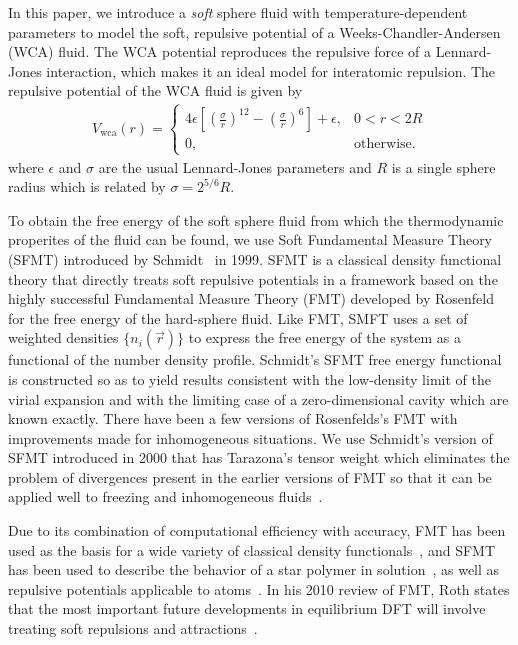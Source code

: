 \documentclass[letterpaper,twocolumn,amsmath,amssymb,prb]{revtex4-1}
\begin{document}
In this paper, we introduce a \textit{soft} sphere fluid 
with temperature-dependent parameters to model the soft, repulsive 
potential of a Weeks-Chandler-Andersen (WCA) fluid. 
The WCA potential reproduces the repulsive force of a Lennard-Jones 
interaction, which makes it an ideal model for interatomic repulsion. 
The repulsive potential of the WCA fluid is given by 
\newcommand\erf{\mathrm{erf}}
\newcommand\Vwca{V_{\mathrm{wca}}}
\newcommand\Verf{V_{\erf}}
\begin{align}
  \Vwca(r) =
  \begin{cases}
    4\epsilon \left[ \left(\frac{\sigma}{r}\right)^{12} -
    \left(\frac{\sigma}{r}\right)^{6} \right] + \epsilon, & 0 < r < 2R \\
    0, & \textrm{otherwise}.
  \end{cases}
\label{eq:Vwca}
\end{align}
where $\epsilon$ and $\sigma$ are the usual Lennard-Jones parameters
and $R$ is a single sphere radius which is related by $\sigma =
2^{5/6} R$.

To obtain the free energy of the soft sphere fluid from which the
thermodynamic properites of the fluid can be found, 
we use Soft Fundamental Measure Theory
(SFMT) introduced by Schmidt~\cite{schmidt1999density} in 1999.
SFMT is a classical density functional
theory that directly treats soft repulsive potentials in a framework
based on the highly successful Fundamental Measure Theory (FMT) developed
by Rosenfeld~\cite{rosenfeld1989} for the free energy of the hard-sphere fluid.
Like FMT, SMFT uses a set of weighted densities $\lbrace{n_i(\vec r)\rbrace}$ 
to express the free energy of the system
as a functional of the number density profile.
Schmidt's SFMT free energy functional is constructed so as to yield results 
consistent with the low-density limit of the virial expansion
and with the limiting case of a zero-dimensional cavity which are known 
exactly. 
There have been a few versions of Rosenfelds's FMT with improvements 
made for inhomogeneous situations. 
We use Schmidt's version of SFMT introduced in 2000 that 
has Tarazona's tensor weight which eliminates the problem of divergences 
present in the earlier versions of FMT so that it can be applied well to 
freezing and inhomogeneous fluids~\cite{schmidt2000fluid,tarazona2000}.

Due to its combination of computational efficiency with accuracy, 
FMT has been used as the
basis for a wide variety of classical density
functionals~\cite{cuesta1997dimensional, hansen2009fundamental,
  marechal2013density, hughes2013classical, krebs2014improved}, and
SFMT has been used to describe the behavior of a star polymer in
solution~\cite{schmidt2000density, groh2001density, kim2001adsorption,
  sweatman2002fundamental}, as well as repulsive potentials applicable
to atoms~\cite{schmidt2000fluid, sweatman2002fundamental}.
In his 2010 review of FMT, Roth states that the most important future
developments in equilibrium DFT will involve treating soft repulsions
and attractions~\cite{roth2010fundamental}.
\end{document}
